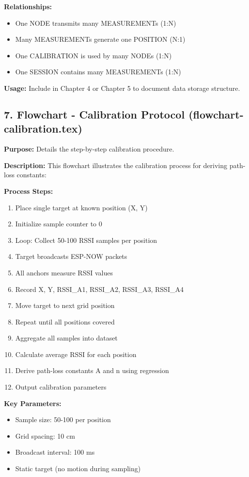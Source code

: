 \textbf{Relationships:}
\begin{itemize}
    \item One NODE transmits many MEASUREMENTs (1:N)
    \item Many MEASUREMENTs generate one POSITION (N:1)
    \item One CALIBRATION is used by many NODEs (1:N)
    \item One SESSION contains many MEASUREMENTs (1:N)
\end{itemize}

\textbf{Usage:} Include in Chapter 4 or Chapter 5 to document data storage structure.

\subsection*{7. Flowchart - Calibration Protocol (flowchart-calibration.tex)}
\textbf{Purpose:} Details the step-by-step calibration procedure.

\textbf{Description:}
This flowchart illustrates the calibration process for deriving path-loss constants:

\textbf{Process Steps:}
\begin{enumerate}
    \item Place single target at known position (X, Y)
    \item Initialize sample counter to 0
    \item Loop: Collect 50-100 RSSI samples per position
    \item Target broadcasts ESP-NOW packets
    \item All anchors measure RSSI values
    \item Record X, Y, RSSI\_A1, RSSI\_A2, RSSI\_A3, RSSI\_A4
    \item Move target to next grid position
    \item Repeat until all positions covered
    \item Aggregate all samples into dataset
    \item Calculate average RSSI for each position
    \item Derive path-loss constants A and n using regression
    \item Output calibration parameters
\end{enumerate}

\textbf{Key Parameters:}
\begin{itemize}
    \item Sample size: 50-100 per position
    \item Grid spacing: 10 cm
    \item Broadcast interval: 100 ms
    \item Static target (no motion during sampling)
\end{itemize}

